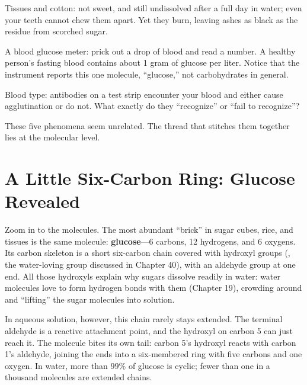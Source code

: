 Tissues and cotton: not sweet, and still undissolved after a full day in water; even your teeth cannot chew them apart. Yet they burn, leaving ashes as black as the residue from scorched sugar.

A blood glucose meter: prick out a drop of blood and read a number. A healthy person's fasting blood contains about 1 gram of glucose per liter. Notice that the instrument reports this one molecule, ``glucose,'' not carbohydrates in general.

Blood type: antibodies on a test strip encounter your blood and either cause agglutination or do not. What exactly do they ``recognize'' or ``fail to recognize''?

These five phenomena seem unrelated. The thread that stitches them together lies at the molecular level.

\section{A Little Six-Carbon Ring: Glucose Revealed}

Zoom in to the molecules. The most abundant ``brick'' in sugar cubes, rice, and tissues is the same molecule: \textbf{glucose}---6 carbons, 12 hydrogens, and 6 oxygens. Its carbon skeleton is a short six-carbon chain covered with hydroxyl groups (, the water-loving group discussed in Chapter 40), with an aldehyde group at one end. All those hydroxyls explain why sugars dissolve readily in water: water molecules love to form hydrogen bonds with them (Chapter 19), crowding around and ``lifting'' the sugar molecules into solution.

In aqueous solution, however, this chain rarely stays extended. The terminal aldehyde is a reactive attachment point, and the hydroxyl on carbon 5 can just reach it. The molecule bites its own tail: carbon 5's hydroxyl reacts with carbon 1's aldehyde, joining the ends into a six-membered ring with five carbons and one oxygen. In water, more than $99\%$ of glucose is cyclic; fewer than one in a thousand molecules are extended chains.

\begin{center}
\end{center}

